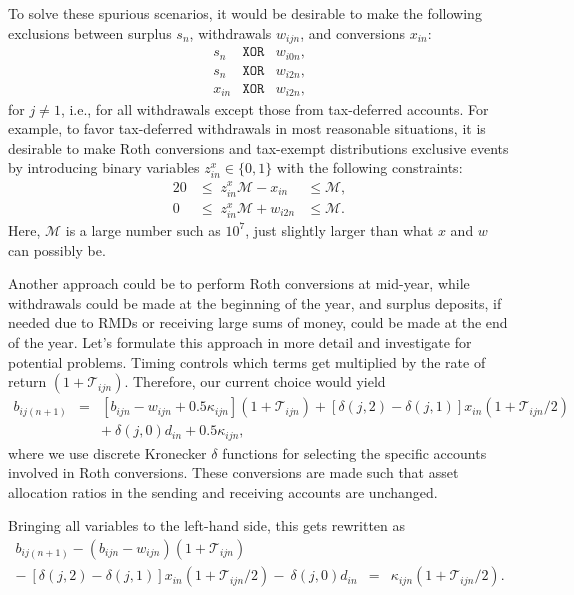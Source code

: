 \documentclass{report}[fleqn,11pt]
\begin{document}
	To solve these spurious scenarios, it would be desirable to make the following exclusions
	between surplus $s_n$, withdrawals $w_{ijn}$, and conversions $x_{in}$:
	\begin{eqnarray*}
		s_n &\texttt{XOR} & w_{i0n}, \\
		s_n &\texttt{XOR} & w_{i2n}, \\
		x_{in} &\texttt{XOR} & w_{i2n},
	\end{eqnarray*}
	for $j \neq 1$, i.e., for all withdrawals except those from tax-deferred accounts.
	For example, to favor tax-deferred withdrawals in most reasonable situations,
	it is desirable to make Roth conversions and tax-exempt distributions exclusive events
	by introducing binary variables $z_{in}^x \in \{0, 1\}$ with the following constraints:
	\begin{alignat}{2}
		\label{Eq:Binary}
		0 & \le \; z_{in}^x \mathcal{M} - x_{in} &\le \mathcal{M}, \nonumber \\
		0 & \le \; z_{in}^x \mathcal{M} + w_{i2n} &\le \mathcal{M}.
	\end{alignat}
	Here, $\mathcal{M}$ is a large number such as $10^7$, just slightly
	larger than what $x$ and $w$ can possibly be.

	Another approach could be to perform Roth conversions at mid-year, while withdrawals
	could be made at the beginning of the year, and surplus deposits,
	if needed due to RMDs or receiving large sums of money,
	could be made at the end of the year. Let's formulate this approach
	in more detail and investigate for potential problems.
	Timing controls which terms get multiplied by the rate of return $(1 + \mathcal{T}_{ijn})$.
	Therefore, our current choice would yield
	\begin{eqnarray}
		\label{Eq:C3a}
		b_{ij(n+1)} &=& [b_{ijn} - w_{ijn} + 0.5\kappa_{ijn}](1 + \mathcal{T}_{ijn})
		+ [\delta(j, 2) - \delta(j, 1)]x_{in} (1 + \mathcal{T}_{ijn}/2)
		\nonumber \\
		&& 
		+\ \delta(j, 0) d_{in} + 0.5 \kappa_{ijn},
	\end{eqnarray}
	where we use discrete Kronecker $\delta$ functions for selecting the specific accounts involved
	in Roth conversions. These conversions are made such that asset allocation
	ratios in the sending and receiving accounts are unchanged.

	Bringing all variables
	to the left-hand side, this gets rewritten as
	\begin{eqnarray}
		\label{Eq:C3}
		b_{ij(n+1)} - (b_{ijn} - w_{ijn}) (1 + \mathcal{T}_{ijn})
		&& \nonumber \\
		-\ [\delta(j, 2) - \delta(j, 1)]x_{in}(1 + \mathcal{T}_{ijn}/2)
		-\ \delta(j, 0) d_{in}
		&=& \kappa_{ijn} (1 + \mathcal{T}_{ijn}/2).
	\end{eqnarray}
\end{document}

